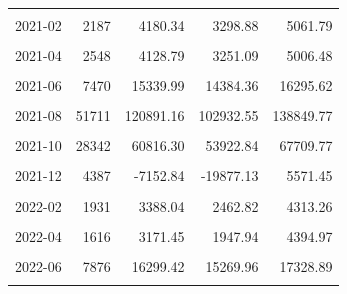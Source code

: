 \begin{longtable}[t]{crrrr}
\cellcolor{gray!10}{2021-01} & \cellcolor{gray!10}{2237} & \cellcolor{gray!10}{1593.99} & \cellcolor{gray!10}{-640.11} & \cellcolor{gray!10}{3828.09}\\
2021-02 & 2187 & 4180.34 & 3298.88 & 5061.79\\
\cellcolor{gray!10}{2021-03} & \cellcolor{gray!10}{2501} & \cellcolor{gray!10}{4797.57} & \cellcolor{gray!10}{3425.98} & \cellcolor{gray!10}{6169.15}\\
2021-04 & 2548 & 4128.79 & 3251.09 & 5006.48\\
\cellcolor{gray!10}{2021-05} & \cellcolor{gray!10}{5288} & \cellcolor{gray!10}{9969.22} & \cellcolor{gray!10}{9175.86} & \cellcolor{gray!10}{10762.57}\\
2021-06 & 7470 & 15339.99 & 14384.36 & 16295.62\\
\cellcolor{gray!10}{2021-07} & \cellcolor{gray!10}{15985} & \cellcolor{gray!10}{23180.90} & \cellcolor{gray!10}{20539.12} & \cellcolor{gray!10}{25822.67}\\
2021-08 & 51711 & 120891.16 & 102932.55 & 138849.77\\
\cellcolor{gray!10}{2021-09} & \cellcolor{gray!10}{49829} & \cellcolor{gray!10}{117868.65} & \cellcolor{gray!10}{108493.98} & \cellcolor{gray!10}{127243.31}\\
2021-10 & 28342 & 60816.30 & 53922.84 & 67709.77\\
\cellcolor{gray!10}{2021-11} & \cellcolor{gray!10}{11596} & \cellcolor{gray!10}{5718.68} & \cellcolor{gray!10}{-4565.68} & \cellcolor{gray!10}{16003.04}\\
2021-12 & 4387 & -7152.84 & -19877.13 & 5571.45\\
\cellcolor{gray!10}{2022-01} & \cellcolor{gray!10}{2759} & \cellcolor{gray!10}{3564.08} & \cellcolor{gray!10}{1802.04} & \cellcolor{gray!10}{5326.12}\\
2022-02 & 1931 & 3388.04 & 2462.82 & 4313.26\\
\cellcolor{gray!10}{2022-03} & \cellcolor{gray!10}{1790} & \cellcolor{gray!10}{1524.64} & \cellcolor{gray!10}{-259.82} & \cellcolor{gray!10}{3309.10}\\
2022-04 & 1616 & 3171.45 & 1947.94 & 4394.97\\
\cellcolor{gray!10}{2022-05} & \cellcolor{gray!10}{6698} & \cellcolor{gray!10}{12694.71} & \cellcolor{gray!10}{11415.35} & \cellcolor{gray!10}{13974.07}\\
2022-06 & 7876 & 16299.42 & 15269.96 & 17328.89\\
\cellcolor{gray!10}{2022-07} & \cellcolor{gray!10}{14212} & \cellcolor{gray!10}{21978.08} & \cellcolor{gray!10}{19595.89} & \cellcolor{gray!10}{24360.26}\\

\end{longtable}
